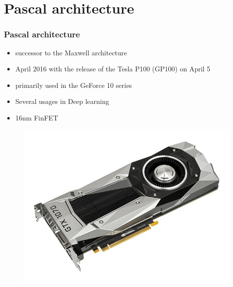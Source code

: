 \documentclass{beamer}
\begin{document}
\section{Pascal architecture}
\begin{frame}
 \frametitle{Pascal architecture}
 \begin{itemize}
 	\item {successor to the Maxwell architecture}
 	\item {April 2016 with the release of the Tesla P100 (GP100) on April 5}
 	\item {primarily used in the GeForce 10 series}
 	\item {Several usages in Deep learning}
 	\item {16nm FinFET}
 \end{itemize}

\begin{figure}
	\centering
	\includegraphics[scale=0.27]{pascal1}
\end{figure}

\end{frame}
\end{document}
